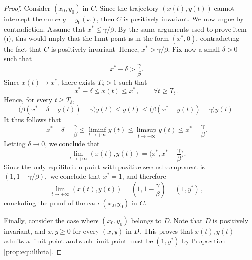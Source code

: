 \documentclass[10pt,a4paper]{amsart}
\begin{document}
\begin{proof}
Consider $(x_0, y_0)$ in $C$. Since the trajectory $(x(t),y(t))$ cannot intercept the curve $y = g_0(x)$, then $C$ is positively invariant. We now argue by contradiction. Assume that $x^* \le \gamma /\beta$. By the same arguments used to prove item (i), this would imply that the limit point is in the form $(x^*,0)$, contradicting the fact that $C$ is positively invariant. Hence, $x^* > \gamma /\beta$.
Fix now a small $\delta>0$ such that
$$
x^*-\delta>\frac{\gamma}{\beta}.
$$
Since $x(t)\to x^*$, there exists $T_\delta>0$ such that
$$
x^* - \delta \le x(t) \le x^*\,,
\qquad \forall t\ge T_\delta\,.
$$
Hence, for every $t\ge T_\delta$,
$$
\big(\beta(x^*-\delta-y(t))-\gamma\big)y(t) \le \dot y(t)
\le
\big(\beta(x^*-y(t))-\gamma\big)y(t).
$$
It thus follows that
$$
x^*-\delta-\frac{\gamma}{\beta}
\le
\liminf_{t\to+\infty}y(t)
\le
\limsup_{t\to+\infty}y(t)
\le
x^*-\frac{\gamma}{\beta}.
$$
Letting $\delta\to0$, we conclude that
$$
\lim_{t \to + \infty} (x(t),y(t)) = \Big(x^*,x^*-\frac{\gamma}{\beta}\Big).$$
Since the only equilibrium point with positive second component is $(1,1-\gamma/\beta),
$
we conclude that $x^*=1$, and therefore
$$
\lim_{t \to +\infty} (x(t),y(t))
=
\left(1,1-\frac{\gamma}{\beta}\right) = (1,y^*)\,,
$$
concluding the proof of the case $(x_0,y_0)$ in $C$.

Finally, consider the case where $(x_0,y_0)$ belongs to $D$. Note that $D$ is positively invariant, and $\dot x,\dot y \ge 0$ for every $(x,y)$ in $D$. This proves that $x(t),y(t)$ admits a limit point and such limit point must be $(1,y^*)$ by Proposition \ref{prop:equilibria}.
\end{proof}
\end{document}
